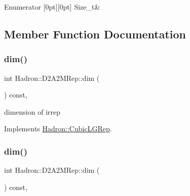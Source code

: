 \begin{DoxyEnumFields}{Enumerator}
[0pt][0pt]{}\mbox{\label{structHadron_1_1D2A2MRep_a10b48233db7563ff06d16db193b08ab0a9beb17643087ce6e48dd40696799fa65}} 
Size\+\_\+t&\\
\hline

\end{DoxyEnumFields}


\subsection{Member Function Documentation}
\mbox{\label{structHadron_1_1D2A2MRep_a8c1eee2c61a4d9f6721fe703253d5c26}} 
\subsubsection{\texorpdfstring{dim()}{dim()}\hspace{0.1cm}{\footnotesize\ttfamily [1/3]}}
{\footnotesize\ttfamily int Hadron\+::\+D2\+A2\+M\+Rep\+::dim (\begin{DoxyParamCaption}{ }\end{DoxyParamCaption}) const\hspace{0.3cm}{\ttfamily [inline]}, {\ttfamily [virtual]}}

dimension of irrep 

Implements \mbox{\hyperlink{structHadron_1_1CubicLGRep_a3acbaea26503ed64f20df693a48e4cdd}{Hadron\+::\+Cubic\+L\+G\+Rep}}.

\mbox{\label{structHadron_1_1D2A2MRep_a8c1eee2c61a4d9f6721fe703253d5c26}} 
\subsubsection{\texorpdfstring{dim()}{dim()}\hspace{0.1cm}{\footnotesize\ttfamily [2/3]}}
{\footnotesize\ttfamily int Hadron\+::\+D2\+A2\+M\+Rep\+::dim (\begin{DoxyParamCaption}{ }\end{DoxyParamCaption}) const\hspace{0.3cm}{\ttfamily [inline]}, {\ttfamily [virtual]}}

